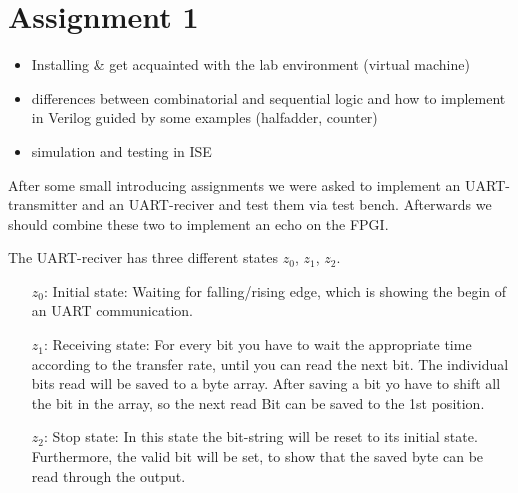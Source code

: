 \section*{Assignment 1}

\begin{itemize}
    \item Installing \& get acquainted with the lab environment (virtual machine)
    \item differences between combinatorial and sequential logic and how to implement in Verilog guided by some examples (halfadder, counter)
    \item simulation and testing in ISE
\end{itemize}


After some small introducing assignments we were asked to implement an UART-transmitter and an UART-reciver and test them via test bench. Afterwards we should combine these two to implement an echo on the FPGI.


The UART-reciver has three different states $z_0$, $z_1$, $z_2$.
\begin{itemize}


\item[$z_0$:] Initial state: Waiting for falling/rising edge, which is showing the begin of an UART communication.
\item[$z_1$:] Receiving state: For every bit you have to wait the appropriate time according to the transfer rate, until you can read the next bit. The individual bits read will be saved to a byte array. After saving a bit yo have to shift all the bit in the array, so the next read Bit can be saved to the 1st position.
\item[$z_2$:] Stop state: In this state the bit-string will be reset to its initial state. Furthermore, the valid bit will be set, to show that the saved byte can be read through the output.
\end{itemize}

